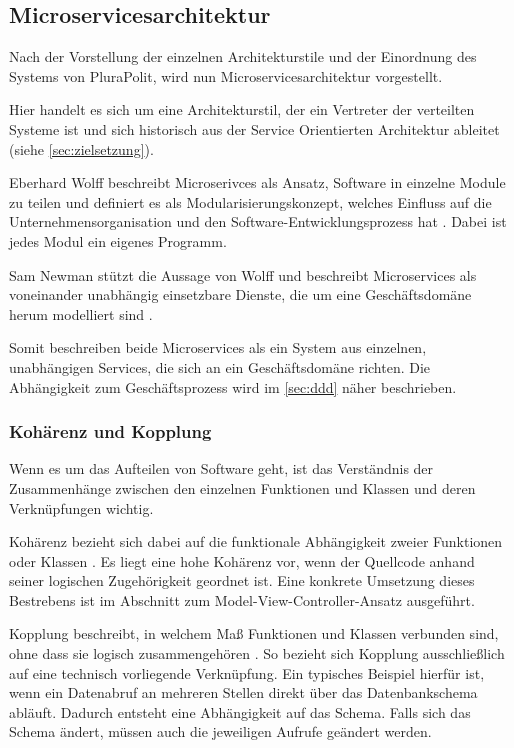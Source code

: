 \subsection{Microservicesarchitektur}
\label{sec:microservices}

Nach der Vorstellung der einzelnen Architekturstile und der Einordnung des Systems von PluraPolit, wird nun Microservicesarchitektur vorgestellt.

Hier handelt es sich um eine Architekturstil, der ein Vertreter der verteilten Systeme ist und sich historisch aus der Service Orientierten Architektur ableitet (siehe \cref{sec:zielsetzung}).

Eberhard Wolff beschreibt Microserivces als Ansatz, Software in einzelne Module zu teilen und definiert es als Modularisierungskonzept, welches Einfluss auf die Unternehmensorganisation und den Software-Entwicklungsprozess hat \parencite[vgl.][Kap. 1.1]{wolff_microservices_2018}. Dabei ist jedes Modul ein eigenes Programm.

Sam Newman stützt die Aussage von Wolff und beschreibt Microservices als voneinander unabhängig einsetzbare Dienste, die um eine Geschäftsdomäne herum modelliert sind \parencite[vgl.][Kap. 2.1]{newman_monolith_2019}.

Somit beschreiben beide Microservices als ein System aus einzelnen, unabhängigen Services, die sich an ein Geschäftsdomäne richten. Die Abhängigkeit zum Geschäftsprozess wird im \cref{sec:ddd} näher beschrieben.

\subsubsection{Kohärenz und Kopplung}

Wenn es um das Aufteilen von Software geht, ist das Verständnis der Zusammenhänge zwischen den einzelnen Funktionen und Klassen und deren Verknüpfungen wichtig.

Kohärenz bezieht sich dabei auf die funktionale Abhängigkeit zweier Funktionen oder Klassen \parencite[vgl.][Kap. 2.3.1]{newman_monolith_2019}.
Es liegt eine hohe Kohärenz vor, wenn der Quellcode anhand seiner logischen Zugehörigkeit geordnet ist. Eine konkrete Umsetzung dieses Bestrebens ist im Abschnitt zum Model-View-Controller-Ansatz ausgeführt.

Kopplung beschreibt, in welchem Maß Funktionen und Klassen verbunden sind, ohne dass sie logisch zusammengehören \parencite[vgl.][Kap. 2.3.2]{newman_monolith_2019}. So bezieht sich Kopplung ausschließlich auf eine technisch vorliegende Verknüpfung. Ein typisches Beispiel hierfür ist, wenn ein Datenabruf an mehreren Stellen direkt über das Datenbankschema abläuft. Dadurch entsteht eine Abhängigkeit auf das Schema. Falls sich das Schema ändert, müssen auch die jeweiligen Aufrufe geändert werden.

